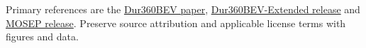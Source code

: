 \documentclass[11pt,a4paper]{article}
\begin{document}
Primary references are the
\href{https://arxiv.org/html/2503.00675v2}{Dur360BEV paper},
\href{https://huggingface.co/datasets/TomEeee/Dur360BEV-Extended}{Dur360BEV-Extended release}
and \href{https://zenodo.org/records/19353314}{MOSEP release}.
Preserve source attribution and applicable license terms with figures and data.
\end{document}
